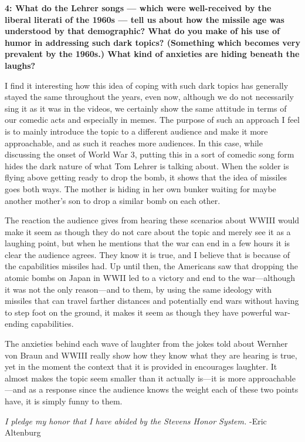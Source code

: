 \documentclass[12pt]{turabian-researchpaper}
\newcommand\question[2]{\noindent\textbf{#1: #2}}
\begin{document}
\question{4}{What do the Lehrer songs — which were well-received by the liberal literati of the 1960s — tell us about how the missile age was understood by that demographic? What do you make of his use of humor in addressing such dark topics? (Something which becomes very prevalent by the 1960s.) What kind of anxieties are hiding beneath the laughs?}
	
	I find it interesting how this idea of coping with such dark topics has generally stayed the same throughout the years, even now, although we do not necessarily sing it as it was in the videos, we certainly show the same attitude in terms of our comedic acts and especially in memes. The purpose of such an approach I feel is to mainly introduce the topic to a different audience and make it more approachable, and as such it reaches more audiences. In this case, while discussing the onset of World War 3, putting this in a sort of comedic song form hides the dark nature of what Tom Lehrer is talking about. When the solder is flying above getting ready to drop the bomb, it shows that the idea of missiles goes both ways. The mother is hiding in her own bunker waiting for maybe another mother's son to drop a similar bomb on each other. 

	The reaction the audience gives from hearing these scenarios about WWIII would make it seem as though they do not care about the topic and merely see it as a laughing point, but when he mentions that the war can end in a few hours it is clear the audience agrees. They know it is true, and I believe that is because of the capabilities missiles had. Up until then, the Americans saw that dropping the atomic bombs on Japan in WWII led to a victory and end to the war—although it was not the only reason—and to them, by using the same ideology with missiles that can travel farther distances and potentially end wars without having to step foot on the ground, it makes it seem as though they have powerful war-ending capabilities. 

	The anxieties behind each wave of laughter from the jokes told about Wernher von Braun and WWIII really show how they know what they are hearing is true, yet in the moment the context that it is provided in encourages laughter. It almost makes the topic seem smaller than it actually is—it is more approachable—and as a response since the audience knows the weight each of these two points have, it is simply funny to them.


\vspace*{\fill}
\noindent\textit{I pledge my honor that I have abided by the Stevens Honor System.} -Eric Altenburg
\end{document}

